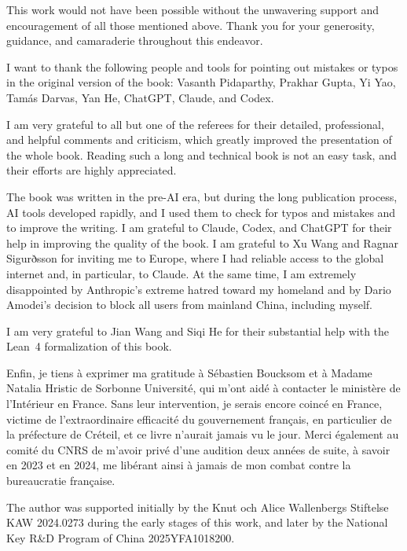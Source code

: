 This work would not have been possible without the unwavering support and encouragement of all those mentioned above. Thank you for your generosity, guidance, and camaraderie throughout this endeavor.

I want to thank the following people and tools for pointing out mistakes or typos in the original version of the book: Vasanth Pidaparthy, Prakhar Gupta, Yi Yao, Tamás Darvas, Yan He, ChatGPT, Claude, and Codex.

I am very grateful to all but one of the referees for their detailed, professional, and helpful comments and criticism, which greatly improved the presentation of the whole book. Reading such a long and technical book is not an easy task, and their efforts are highly appreciated.

The book was written in the pre-AI era, but during the long publication process, AI tools developed rapidly, and I used them to check for typos and mistakes and to improve the writing. I am grateful to Claude, Codex, and ChatGPT for their help in improving the quality of the book. I am grateful to Xu Wang and Ragnar Sigurðsson for inviting me to Europe, where I had reliable access to the global internet and, in particular, to Claude.
At the same time, I am extremely disappointed by Anthropic's extreme hatred toward my homeland and by Dario Amodei's decision to block all users from mainland China, including myself.

I am very grateful to Jian Wang and Siqi He for their substantial help with the Lean~4 formalization of this book.

Enfin, je tiens à exprimer ma gratitude à Sébastien Boucksom et à Madame Natalia Hristic de Sorbonne Université, qui m'ont aidé à contacter le ministère de l'Intérieur en France. Sans leur intervention, je serais encore coincé en France, victime de l'extraordinaire efficacité du gouvernement français, en particulier de la préfecture de Créteil, et ce livre n'aurait jamais vu le jour. Merci également au comité du CNRS de m'avoir privé d'une audition deux années de suite, à savoir en 2023 et en 2024, me libérant ainsi à jamais de mon combat contre la bureaucratie française.


The author was supported initially by the Knut och Alice Wallenbergs Stiftelse KAW 2024.0273 during the early stages of this work, and later by the National Key R\&D Program of China 2025YFA1018200.
